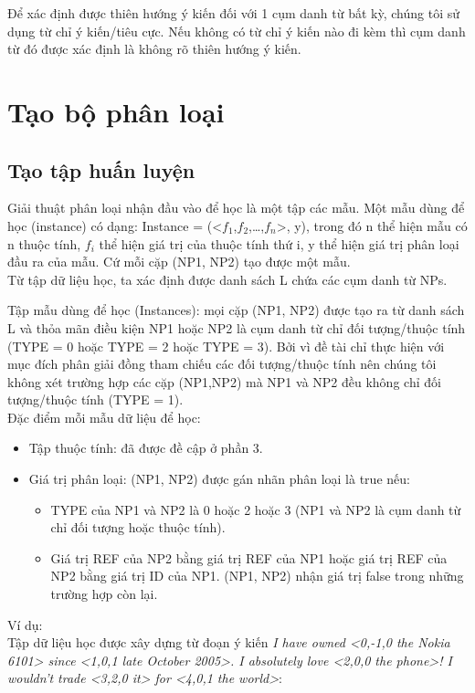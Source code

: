 \documentclass[12pt]{report}
\begin{document}
				\par Để xác định được thiên hướng ý kiến đối với 1 cụm danh từ bất kỳ, chúng tôi sử dụng từ chỉ ý kiến/tiêu cực. Nếu không có từ chỉ ý kiến nào đi kèm thì cụm danh từ đó được xác định là không rõ thiên hướng ý kiến.

		\section{Tạo bộ phân loại}
			\subsection*{Tạo tập huấn luyện}
				\par Giải thuật phân loại nhận đầu vào để học là một tập các mẫu. Một mẫu dùng để học (instance) có dạng: Instance = (<$f_1$,$f_2$,…,$f_n$>, y), trong đó n thể hiện mẫu có n thuộc tính, $f_i$ thể hiện giá trị của thuộc tính thứ i, y thể hiện giá trị phân loại đầu ra của mẫu. Cứ mỗi cặp (NP1, NP2) tạo được một mẫu. 
				\\Từ tập dữ liệu học, ta xác định được danh sách L chứa các cụm danh từ NPs.
				\par Tập mẫu dùng để học (Instances): mọi cặp (NP1, NP2) được tạo ra từ danh sách L và thỏa mãn điều kiện NP1 hoặc NP2 là cụm danh từ chỉ đối tượng/thuộc tính (TYPE = 0 hoặc TYPE = 2 hoặc TYPE = 3). Bởi vì đề tài chỉ thực hiện với mục đích phân giải đồng tham chiếu các đối tượng/thuộc tính nên chúng tôi không xét trường hợp các cặp (NP1,NP2) mà NP1 và NP2 đều không chỉ đối tượng/thuộc tính (TYPE = 1).
				\\Đặc điểm mỗi mẫu dữ liệu để học:
				\begin{itemize}
					\item{Tập thuộc tính: đã được đề cập ở phần 3.}
					\item{Giá trị phân loại: (NP1, NP2) được gán nhãn phân loại là true nếu:
						\begin{itemize}
							\item{TYPE của NP1 và NP2 là 0 hoặc 2 hoặc 3 (NP1 và NP2 là cụm danh từ chỉ đối tượng hoặc thuộc tính).}
							\item{Giá trị REF của NP2 bằng giá trị REF của NP1 hoặc giá trị REF của NP2 bằng giá trị ID của NP1. (NP1, NP2) nhận giá trị false trong những trường hợp còn lại.}
						\end{itemize}}
				\end{itemize}
				\par Ví dụ: 
				\\Tập dữ liệu học được xây dựng từ đoạn ý kiến \textit{I have owned <0,-1,0 the Nokia 6101> since <1,0,1 late October 2005>. I absolutely love <2,0,0 the phone>! I wouldn't trade <3,2,0 it> for <4,0,1 the world>}:
\end{document}

